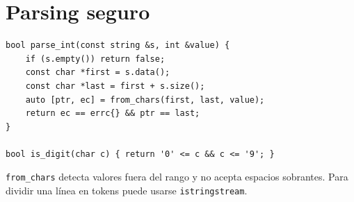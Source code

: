 \section{Parsing seguro}

\begin{lstlisting}[style=cpp]
bool parse_int(const string &s, int &value) {
    if (s.empty()) return false;
    const char *first = s.data();
    const char *last = first + s.size();
    auto [ptr, ec] = from_chars(first, last, value);
    return ec == errc{} && ptr == last;
}

bool is_digit(char c) { return '0' <= c && c <= '9'; }
\end{lstlisting}

\texttt{from\_chars} detecta valores fuera del rango y no acepta espacios
sobrantes. Para dividir una l\'inea en tokens puede usarse
\texttt{istringstream}.

